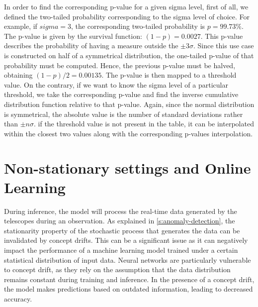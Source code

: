 In order to find the corresponding p-value for a given sigma level, first of all, we defined the two-tailed probability corresponding to the sigma level of choice. For example, if $sigma=3$, the corresponding two-tailed probability is $p=99.73\%$. The p-value is given by the survival function: $(1-p)=0.0027$. This p-value describes the probability of having a measure outside the  $\pm3\sigma$. Since this use case is constructed on half of a symmetrical distribution, the one-tailed p-value of that probability must be computed. Hence, the previous p-value must be halved, obtaining $(1-p)/2=0.00135$. The p-value is then mapped to a threshold value. On the contrary, if we want to know the sigma level of a particular threshold, we take the corresponding p-value and find the inverse cumulative distribution function relative to that p-value. Again, since the normal distribution is symmetrical, the absolute value is the number of standard deviations rather than  $\pm n\sigma$. if the threshold value is not present in the table, it can be interpolated within the closest two values along with the corresponding p-values interpolation.  


\section{Non-stationary settings and Online Learning}
\label{s:non-stationary-settings}
During inference, the model will process the real-time data generated by the telescopes during an observation. As explained in \autoref{s:anomaly-detection}, the stationarity property of the stochastic process that generates the data can be invalidated by concept drifts. This can be a significant issue as it can negatively impact the performance of a machine learning model trained under a certain statistical distribution of input data. Neural networks are particularly vulnerable to concept drift, as they rely on the assumption that the data distribution remains constant during training and inference. In the presence of a concept drift, the model makes predictions based on outdated information, leading to decreased accuracy. 





  